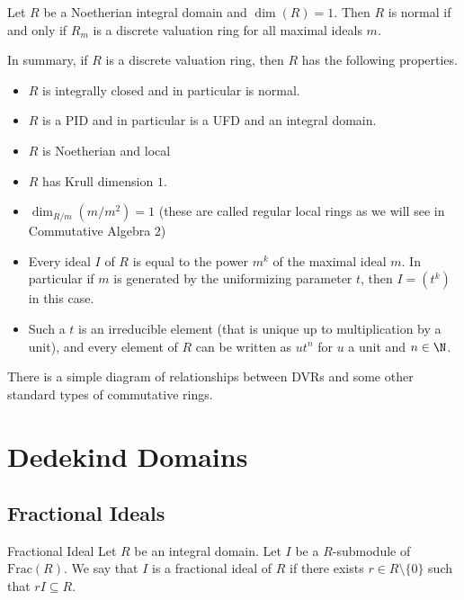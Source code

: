 \documentclass[a4paper]{article}
\begin{document}
\begin{prp}{}{} Let $R$ be a Noetherian integral domain and $\dim(R)=1$. Then $R$ is normal if and only if $R_m$ is a discrete valuation ring for all maximal ideals $m$. 
\end{prp}

In summary, if $R$ is a discrete valuation ring, then $R$ has the following properties. 
\begin{itemize}
\item $R$ is integrally closed and in particular is normal. 
\item $R$ is a PID and in particular is a UFD and an integral domain. 
\item $R$ is Noetherian and local
\item $R$ has Krull dimension $1$. 
\item $\dim_{R/m}(m/m^2)=1$ (these are called regular local rings as we will see in Commutative Algebra $2$)
\item Every ideal $I$ of $R$ is equal to the power $m^k$ of the maximal ideal $m$. In particular if $m$ is generated by the uniformizing parameter $t$, then $I=(t^k)$ in this case. 
\item Such a $t$ is an irreducible element (that is unique up to multiplication by a unit), and every element of $R$ can be written as $ut^n$ for $u$ a unit and $n\in\N$. 
\end{itemize}

There is a simple diagram of relationships between DVRs and some other standard types of commutative rings. 


\pagebreak

\section{Dedekind Domains}
\subsection{Fractional Ideals}
\begin{defn}{Fractional Ideal}{} Let $R$ be an integral domain. Let $I$ be a $R$-submodule of $\text{Frac}(R)$. We say that $I$ is a fractional ideal of $R$ if there exists $r\in R\setminus\{0\}$ such that $rI\subseteq R$. 
\end{defn}
\end{document}
